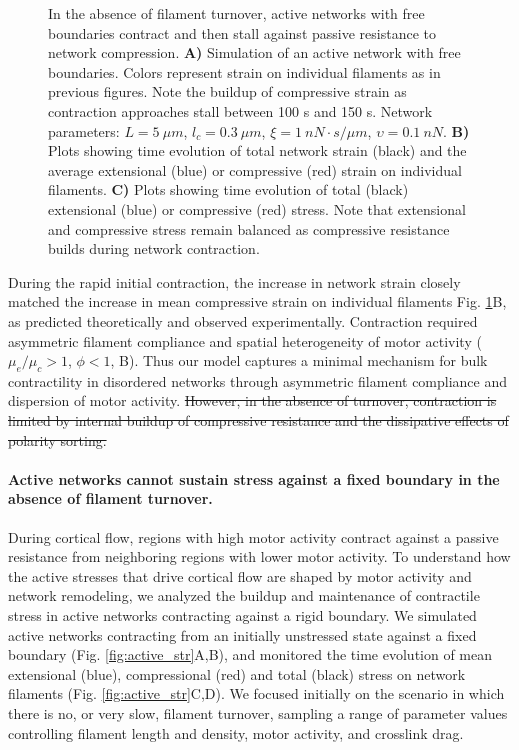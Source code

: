 \documentclass[10pt,letterpaper]{article}
\providecommand{\DIFdeltex}[1]{{\protect\color{red}\sout{#1}}}                      %
\providecommand{\DIFdelbegin}{} %
\providecommand{\DIFdelend}{} %
\providecommand{\DIFdel}[1]{\texorpdfstring{\DIFdeltex{#1}}{}} %
\begin{document}
\begin{figure}[h!]
	\centering
	\caption{\label{fig:active_con} In the absence of filament turnover, active networks with free boundaries contract and then stall against passive resistance to network compression. \textbf{A)}  Simulation of an active network with free boundaries. Colors represent strain on individual filaments as in previous figures.  Note the buildup of compressive strain as contraction approaches stall between 100 s and 150 s.  Network parameters: $L=5\: \mu m$, $l_c=0.3\: \mu m$, $\xi=1\: nN\cdot s/\mu m$, $\upsilon=0.1\: nN$.  \textbf{B)} Plots showing time evolution of total network strain (black) and the average extensional (blue) or compressive (red) strain on individual filaments.   \textbf{C)} Plots showing time evolution of total (black) extensional (blue) or compressive (red) stress.  Note that extensional and compressive stress remain balanced as compressive resistance builds during network contraction.}
\end{figure}

During the rapid initial contraction, the increase in network strain closely matched the increase in mean compressive strain on individual filaments Fig. \ref{fig:active_con}B, as predicted theoretically \cite{1367-2630-14-3-033037,PhysRevX.4.041002} and observed experimentally\cite{rheo_2D1}. Contraction required asymmetric filament compliance and spatial heterogeneity of motor activity ($\mu_e/\mu_c > 1$, $\phi<1$, B). Thus our model captures a minimal mechanism for bulk contractility in disordered networks through asymmetric filament compliance and dispersion of motor activity. 
\DIFdelbegin \DIFdel{However, in the absence of turnover, contraction is limited by internal buildup of compressive resistance and the dissipative effects of polarity sorting.
}\DIFdelend 


\paragraph{Active networks cannot sustain stress against a fixed boundary in the absence of filament turnover.}

During cortical flow, regions with high motor activity contract against a passive resistance from neighboring regions with lower motor activity.  To understand how the active stresses that drive cortical flow are shaped by motor activity and network remodeling, we analyzed the buildup and maintenance of contractile stress in active networks contracting against a rigid boundary. We simulated active networks contracting from an initially unstressed state against a fixed boundary (Fig. \ref{fig:active_str}A,B), and  monitored the time evolution of mean extensional (blue), compressional (red) and total (black) stress on network filaments (Fig. \ref{fig:active_str}C,D). We focused initially on the scenario in which there is no, or very slow, filament turnover, sampling a range of parameter values controlling filament length and density, motor activity, and crosslink drag. 
\end{document}
